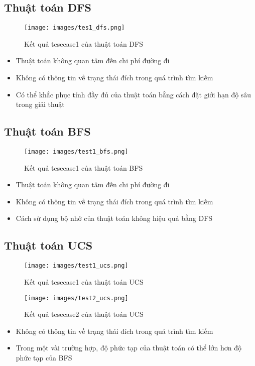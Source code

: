 \documentclass[a4paper, 12pt]{article}
\begin{document}
    \subsection{Thuật toán DFS}
    \begin{figure}[H]
        \begin{center}
            \texttt{[image: images/tes1\_dfs.png]}
            \caption{Kết quả tesecase1 của thuật toán DFS}
        \end{center}
    \end{figure}
    \begin{itemize}
        \item Thuật toán không quan tâm đến chi phí đường đi 
        \item Không có thông tin về trạng thái đích trong quá trình tìm kiếm
        \item Có thể khắc phục tính đầy đủ của thuật toán bằng cách đặt giới hạn độ sâu trong giải thuật
    \end{itemize}

    \subsection{Thuật toán BFS}
    \begin{figure}[H]
        \begin{center}
            \texttt{[image: images/test1\_bfs.png]}
            \caption{Kết quả tesecase1 của thuật toán BFS}
        \end{center}
    \end{figure}
    \begin{itemize}
        \item Thuật toán không quan tâm đến chi phí đường đi
        \item Không có thông tin về trạng thái đích trong quá trình tìm kiếm
        \item Cách sử dụng bộ nhớ của thuật toán không hiệu quả bằng DFS
    \end{itemize}

    \subsection{Thuật toán UCS}
    \begin{figure}[H]
        \begin{center}
            \texttt{[image: images/test1\_ucs.png]}
            \caption{Kết quả tesecase1 của thuật toán UCS}
            \texttt{[image: images/test2\_ucs.png]}
            \caption{Kết quả tesecase2 của thuật toán UCS}
        \end{center}
    \end{figure}
    \begin{itemize}
        \item Không có thông tin về trạng thái đích trong quá trình tìm kiếm
        \item Trong một vài trường hợp, độ phức tạp của thuật toán có thể lớn hơn độ phức tạp của BFS
    \end{itemize}
\end{document}
